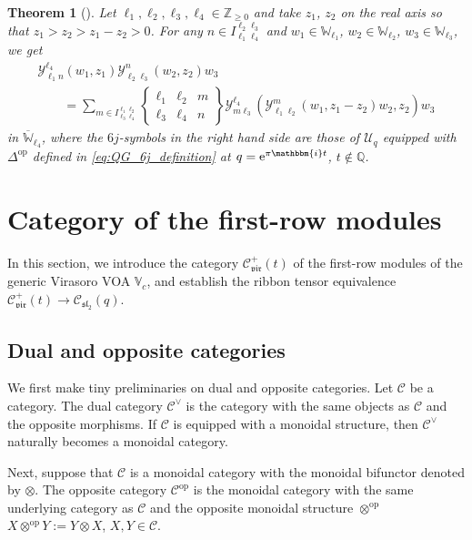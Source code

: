 \documentclass[pdftex]{sigma}
\numberwithin{equation}{section}
\newtheorem{thm}{Theorem}[section]
\newcommand{\ol}[1]{\overline{#1}}
\newcommand{\op}{\mathrm{op}}
\newcommand{\bQ}{\mathbb{Q}}
\newcommand{\bZ}{\mathbb{Z}}
\newcommand{\cC}{\mathcal{C}}
\newcommand{\cU}{\mathcal{U}}
\newcommand{\fsl}{\mathfrak{sl}}
\newcommand{\bbmi}{\mathbbm{i}}
\newcommand{\UEA}{\cU}
\newcommand{\Uq}{\UEA_{q}}
\newcommand{\QGcoprod}{\Delta}
\newcommand{\sixjsymb}[6]{
\left\{
\begin{array}{ccc}
 #1 & #2 & #5 \\
 #3 & #4 & #6
\end{array}
\right\}
}
\newcommand{\catQG}{\cC_{\fsl_{2}}}
\newcommand{\catVir}{\cC_{\vir}}
\newcommand{\catgen}{\cC}
\newcommand{\Chan}[4]{I^{#1 #2}_{#3 #4}}
\newcommand{\voaint}{\mathcal{Y}}
\newcommand{\vmodvec}{w}
\newcommand{\virvoa}{\mathbb{V}}
\newcommand{\virmod}{\mathbb{W}}
\newcommand{\vir}{\mathfrak{vir}}
\begin{document}
\begin{thm}[\cite{KoshidaKytola2022}]
\label{thm:associativity_int_op_frmods}
Let $\ell_{1},\ell_{2},\ell_{3},\ell_{4}\in\bZ_{\geq 0}$ and take $z_{1}$, $z_{2}$ on the real axis so that $z_{1}>z_{2}>z_{1}-z_{2}>0$.
For any $n\in \Chan{\ell_{2}}{\ell_{3}}{\ell_{1}}{\ell_{4}}$ and $\vmodvec_{1}\in\virmod_{\ell_{1}}$, $\vmodvec_{2}\in\virmod_{\ell_{2}}$, $\vmodvec_{3}\in \virmod_{\ell_{3}}$,
we get
\begin{gather*}
 \voaint_{\ell_{1} n}^{\ell_{4}}(\vmodvec_{1},z_{1})\voaint_{\ell_{2} \ell_{3}}^{n}(\vmodvec_{2},z_{2})\vmodvec_{3} \\
 \qquad = \sum_{m\in \Chan{\ell_{1}}{\ell_{2}}{\ell_{3}}{\ell_{4}}}\sixjsymb{\ell_{1}}{\ell_{2}}{\ell_{3}}{\ell_{4}}{m}{n}\voaint_{m \ell_{3}}^{\ell_{4}}\left(\voaint_{\ell_{1} \ell_{2}}^{m}(\vmodvec_{1},z_{1}-z_{2})\vmodvec_{2},z_{2}\right)\vmodvec_{3}
\end{gather*}
in $\ol{\virmod}_{\ell_{4}}$,
where the $6j$-symbols in the right hand side are those of $\Uq$ equipped with $\QGcoprod^{\op}$ defined in \eqref{eq:QG_6j_definition} at
$q={\rm e}^{\pi \bbmi t}$, $ t\not\in\bQ$.
\end{thm}


\section{Category of the first-row modules}
\label{sect:first-row_module_category}
In this section, we introduce the category $\catVir^{+}(t)$ of the first-row modules of the generic Virasoro VOA $\virvoa_{c}$,
and establish the ribbon tensor equivalence $\catVir^{+}(t)\to \catQG (q)$.

\subsection{Dual and opposite categories}
We first make tiny preliminaries on dual and opposite categories.
Let $\catgen$ be a category.
The dual category $\catgen^{\vee}$ is the category with the same objects as $\catgen$ and the opposite morphisms.
If $\catgen$ is equipped with a monoidal structure, then $\catgen^{\vee}$ naturally becomes a monoidal category.

Next, suppose that $\catgen$ is a monoidal category with the monoidal bifunctor denoted by $\otimes$.
The opposite category $\catgen^{\op}$ is the monoidal category with the same underlying category as $\catgen$ and the opposite monoidal structure $\otimes^{\op}$
$
 X\otimes^{\op}Y:=Y\otimes X$, $ X,Y\in\catgen$.
\end{document}
